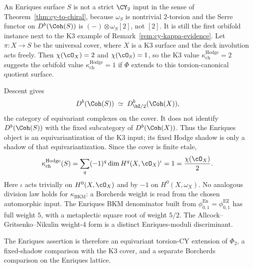\begin{remark}
\label{rem:enriques-orbifold-kappa}
An Enriques surface $S$ is not a strict $\CY_2$ input in the sense of Theorem~\textup{\ref{thm:cy-to-chiral}}, because $\omega_S$ is nontrivial $2$-torsion and the Serre functor on $D^b(\Coh(S))$ is $(-)\otimes \omega_S[2]$, not $[2]$. It is still the first orbifold instance next to the K3 example of Remark~\textup{\ref{rem:cy-kappa-evidence}}. Let $\pi \colon X \to S$ be the universal cover, where $X$ is a K3 surface and the deck involution acts freely. Then $\chi(\cO_X) = 2$ and $\chi(\cO_S) = 1$, so the K3 value $\kappa_{\mathrm{ch}}^{\mathrm{Hodge}} = 2$ suggests the orbifold value $\kappa_{\mathrm{ch}}^{\mathrm{Hodge}} = 1$ if $\Phi$ extends to this torsion-canonical quotient surface.

Descent gives
\[
 D^b(\Coh(S))\;\simeq\;D^b_{\bZ/2}(\Coh(X)),
\]
the category of equivariant complexes on the cover.  It does not identify
$D^b(\Coh(S))$ with the fixed subcategory of $D^b(\Coh(X))$.  Thus the
Enriques object is an equivariantization of the K3 input; its fixed
Hodge shadow is only a shadow of that equivariantization.  Since the
cover is finite etale,
\[
 \kappa_{\mathrm{ch}}^{\mathrm{Hodge}}(S)
 =
 \sum_q(-1)^q\dim H^q(X,\cO_X)^{\iota}
 =
 1
 =
 \frac{\chi(\cO_X)}{2}.
\]
Here $\iota$ acts trivially on $H^0(X,\cO_X)$ and by $-1$ on
$H^0(X,\omega_X)$.  No analogous division law holds for
$\kappa_{\mathrm{BKM}}$: a Borcherds weight is read from the chosen
automorphic input.  The Enriques BKM denominator built from
\(\phi^{\mathrm{En}}_{0,1}=\phi^{\mathrm{EZ}}_{0,1}\) has full weight
\(5\), with a metaplectic square root of weight \(5/2\).  The
Allcock--Gritsenko--Nikulin weight-$4$ form is a distinct
Enriques-moduli discriminant.

The Enriques assertion is therefore an equivariant torsion-CY extension
of $\Phi_2$, a fixed-shadow comparison with the K3 cover, and a separate
Borcherds comparison on the Enriques lattice.
\end{remark}



